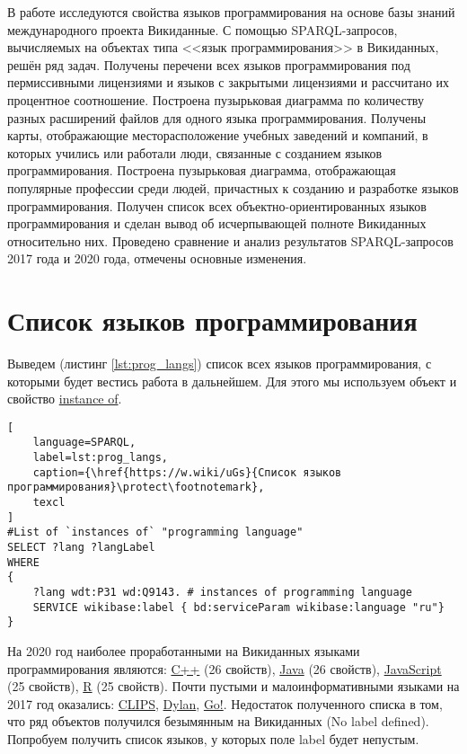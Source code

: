 В работе исследуются свойства языков программирования на основе базы знаний международного проекта Викиданные. С помощью SPARQL-запросов, вычисляемых на объектах типа <<язык программирования>>  в Викиданных, решён ряд задач. Получены перечени всех языков программирования под пермиссивными лицензиями и языков с закрытыми лицензиями и рассчитано их процентное соотношение. Построена пузырьковая диаграмма по количеству разных расширений файлов для одного языка программирования. Получены карты, отображающие месторасположение учебных заведений и компаний, в которых учились или работали люди, связанные с созданием языков программирования. Построена пузырьковая диаграмма, отображающая популярные профессии среди людей, причастных к созданию и разработке языков программирования. Получен список всех объектно-ориентированных языков программирования и сделан вывод об исчерпывающей полноте Викиданных относительно них. Проведено сравнение и анализ результатов SPARQL-запросов 2017 года и 2020 года, отмечены основные изменения. 

\section{Список языков программирования}
Выведем (листинг \ref{lst:prog_langs}) список всех языков программирования, с которыми будет вестись работа в дальнейшем. Для этого мы используем объект  и свойство \href{https://www.wikidata.org/wiki/Property:P31}{instance of}.

\begin{lstlisting}[
	language=SPARQL,
	label=lst:prog_langs,
	caption={\href{https://w.wiki/uGs}{Список языков программирования}\protect\footnotemark},
	texcl 
]
#List of `instances of` "programming language" 
SELECT ?lang ?langLabel
WHERE
{
    ?lang wdt:P31 wd:Q9143. # instances of programming language
    SERVICE wikibase:label { bd:serviceParam wikibase:language "ru"}
}
\end{lstlisting}

На 2020 год наиболее проработанными на Викиданных языками программирования являются: \href{https://www.wikidata.org/wiki/Q2407}{C++} (26 свойств), \href{https://www.wikidata.org/wiki/Q251}{Java} (26 свойств), \href{https://www.wikidata.org/wiki/Q2005}{JavaScript} (25 свойств), \href{https://www.wikidata.org/wiki/Q206904}{R} (25 свойств).
Почти пустыми и малоинформативными языками на 2017 год оказались: \href{https://www.wikidata.org/wiki/Q165372}{CLIPS}, \href{https://www.wikidata.org/wiki/Q1268744}{Dylan}, \href{https://www.wikidata.org/wiki/Q3109515}{Go!}.
Недостаток полученного списка в том, что ряд объектов получился безымянным на Викиданных (No label defined). Попробуем получить список языков, у которых поле label  будет непустым.

